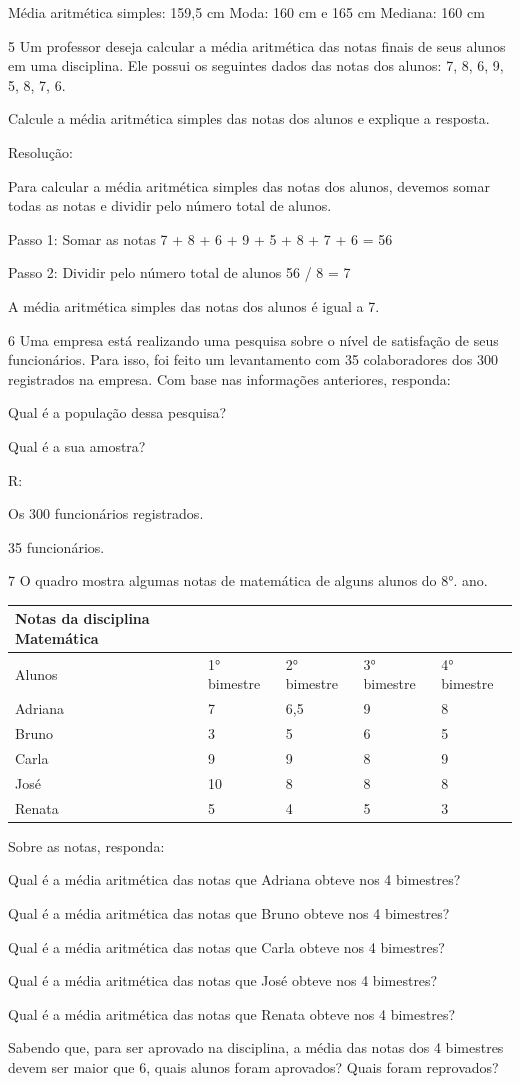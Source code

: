 {Média aritmética simples: 159,5 cm Moda: 160 cm e 165 cm Mediana: 160 cm

\num{5} Um professor deseja calcular a média aritmética das notas finais de
seus alunos em uma disciplina. Ele possui os seguintes dados das notas
dos alunos: 7, 8, 6, 9, 5, 8, 7, 6.

Calcule a média aritmética simples das notas dos alunos e explique a
resposta.

Resolução:

Para calcular a média aritmética simples das notas dos alunos, devemos
somar todas as notas e dividir pelo número total de alunos.

Passo 1: Somar as notas 7 + 8 + 6 + 9 + 5 + 8 + 7 + 6 = 56

Passo 2: Dividir pelo número total de alunos 56 / 8 = 7

A média aritmética simples das notas dos alunos é igual a 7.

\num{6} Uma empresa está realizando uma pesquisa sobre o nível de satisfação
de seus funcionários. Para isso, foi feito um levantamento com 35
colaboradores dos 300 registrados na empresa. Com base nas informações
anteriores, responda:
\item Qual é a população dessa pesquisa?
\item Qual é a sua amostra?

R:
\item Os 300 funcionários registrados.
\item 35 funcionários.

\num{7} O quadro mostra algumas notas de matemática de alguns alunos do 8°.
ano.


\begin{longtable}[]{@{}lllll@{}}
\toprule
Notas da disciplina Matemática & & & &\tabularnewline
\midrule
\endhead
Alunos & 1° bimestre & 2° bimestre & 3° bimestre & 4°
bimestre\tabularnewline
Adriana & 7 & 6,5 & 9 & 8\tabularnewline
Bruno & 3 & 5 & 6 & 5\tabularnewline
Carla & 9 & 9 & 8 & 9\tabularnewline
José & 10 & 8 & 8 & 8\tabularnewline
Renata & 5 & 4 & 5 & 3\tabularnewline
\bottomrule
\end{longtable}

Sobre as notas, responda:
\item Qual é a média aritmética das notas que Adriana obteve nos 4
bimestres?
\item Qual é a média aritmética das notas que Bruno obteve nos 4 bimestres?
\item Qual é a média aritmética das notas que Carla obteve nos 4 bimestres?
\item Qual é a média aritmética das notas que José obteve nos 4 bimestres?
\item Qual é a média aritmética das notas que Renata obteve nos 4
bimestres?
\item Sabendo que, para ser aprovado na disciplina, a média das notas dos 4
bimestres devem ser maior que 6, quais alunos foram aprovados? Quais
foram reprovados?

}
